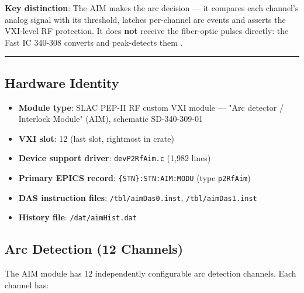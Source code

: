 \textbf{Key distinction}: The AIM makes the arc decision --- it compares each channel's analog signal with its threshold, latches per-channel arc events and asserts the VXI-level RF protection. It does \textbf{not} receive the fiber-optic pulses directly: the Fast IC 340-308 converts and peak-detects them .

\begin{center}\rule{0.5\linewidth}{0.5pt}\end{center}

\subsection{Hardware Identity}\label{sec:aim-hw}


\begin{itemize}
\tightlist
\item
  \textbf{Module type}: SLAC PEP-II RF custom VXI module --- "Arc detector / Interlock Module" (AIM), schematic SD-340-309-01
\item
  \textbf{VXI slot}: 12 (last slot, rightmost in crate)
\item
  \textbf{Device support driver}: \texttt{devP2RfAim.c} (1,982 lines)
\item
  \textbf{Primary EPICS record}: \texttt{\{STN\}:\allowbreak{}STN:\allowbreak{}AIM:\allowbreak{}MODU} (type \texttt{p2RfAim})
\item
  \textbf{DAS instruction files}: \texttt{/\allowbreak{}tbl/\allowbreak{}aimDas0.\allowbreak{}inst}, \texttt{/\allowbreak{}tbl/\allowbreak{}aimDas1.\allowbreak{}inst}
\item
  \textbf{History file}: \texttt{/\allowbreak{}dat/\allowbreak{}aimHist.\allowbreak{}dat}
\end{itemize}

\subsection{Arc Detection (12 Channels)}\label{sec:aim-arc}


The AIM module has 12 independently configurable arc detection channels. Each channel has:

